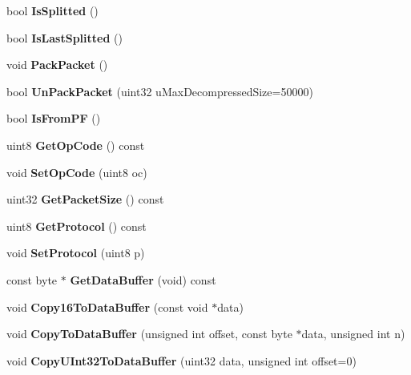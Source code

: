 \begin{DoxyCompactItemize}
\item 
bool {\bfseries IsSplitted} ()\label{classCPacket_a349ae079d5177cfe9be36b8a18d23346}

\item 
bool {\bfseries IsLastSplitted} ()\label{classCPacket_a6c139a901aeeaf7bf0a2cdd2857895b3}

\item 
void {\bfseries PackPacket} ()\label{classCPacket_a1c52d4829626f9d0e0da9b235d47bf82}

\item 
bool {\bfseries UnPackPacket} (uint32 uMaxDecompressedSize=50000)\label{classCPacket_a6e29f1705f6e549874aea1caf1b4fcfe}

\item 
bool {\bfseries IsFromPF} ()\label{classCPacket_a79a25c2aa547a0841fe01a625271474e}

\item 
uint8 {\bfseries GetOpCode} () const \label{classCPacket_a448fa44f3fb21f2918092e9014885522}

\item 
void {\bfseries SetOpCode} (uint8 oc)\label{classCPacket_a6db96567ab2d9a4b7ec952e901ebe304}

\item 
uint32 {\bfseries GetPacketSize} () const \label{classCPacket_aa93f45774c409dbbd14a14be0cd4a605}

\item 
uint8 {\bfseries GetProtocol} () const \label{classCPacket_ac5fdc550d95f30582a6922f7c1f88ee3}

\item 
void {\bfseries SetProtocol} (uint8 p)\label{classCPacket_aeedd45eb501dc40dd6a07277c5b84891}

\item 
const byte $\ast$ {\bfseries GetDataBuffer} (void) const \label{classCPacket_a9c1eeaaa24340edc1fa7803d66f7dc35}

\item 
void {\bfseries Copy16ToDataBuffer} (const void $\ast$data)\label{classCPacket_a162073976a9b87f801506aa562a4c609}

\item 
void {\bfseries CopyToDataBuffer} (unsigned int offset, const byte $\ast$data, unsigned int n)\label{classCPacket_a93dee374997c34a166eaa3504d6c848d}

\item 
void {\bfseries CopyUInt32ToDataBuffer} (uint32 data, unsigned int offset=0)\label{classCPacket_a403c3db73c731cc860fc13a52749d30c}

\end{DoxyCompactItemize}
